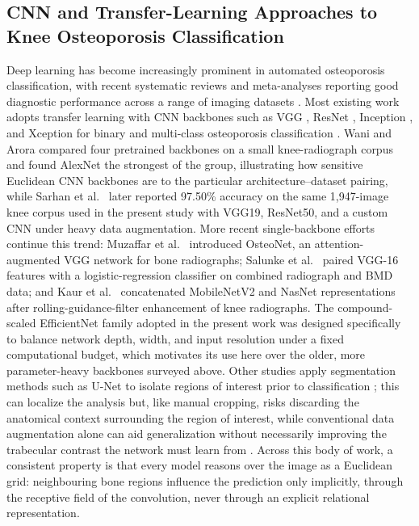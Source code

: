 \documentclass[journal]{IEEEtran}
\begin{document}
\subsection{CNN and Transfer-Learning Approaches to Knee Osteoporosis Classification}
Deep learning has become increasingly prominent in automated osteoporosis
classification, with recent systematic reviews and meta-analyses reporting good
diagnostic performance across a range of imaging datasets
\cite{Amani2024, yen2024diagnostic, wasti2025deep}. Most existing work adopts
transfer learning with CNN backbones such as VGG \cite{simonyan2015very},
ResNet \cite{he2016deep}, Inception \cite{szegedy2015going}, and Xception
\cite{chollet2017xception} for binary and multi-class osteoporosis
classification \cite{Chen2024, Feng2024, wani2023osteoporosis, Sarhan2024}.
Wani and Arora \cite{wani2023osteoporosis} compared four pretrained backbones on
a small knee-radiograph corpus and found AlexNet the strongest of the group,
illustrating how sensitive Euclidean CNN backbones are to the particular
architecture--dataset pairing, while Sarhan et al.\ \cite{Sarhan2024} later
reported 97.50\% accuracy on the same 1,947-image knee corpus used in the
present study with VGG19, ResNet50, and a custom CNN under heavy data
augmentation. More recent single-backbone efforts continue this trend: Muzaffar
et al.\ \cite{muzaffar2025osteonet} introduced OsteoNet, an attention-augmented
VGG network for bone radiographs; Salunke et al.\ \cite{salunke2025osteoporosis}
paired VGG-16 features with a logistic-regression classifier on combined
radiograph and BMD data; and Kaur et al.\ \cite{kaur2026interpretable}
concatenated MobileNetV2 and NasNet representations after rolling-guidance-filter
enhancement of knee radiographs. The compound-scaled EfficientNet family
\cite{tan2019efficientnet} adopted in the present work was designed specifically
to balance network depth, width, and input resolution under a fixed
computational budget, which motivates its use here over the older, more
parameter-heavy backbones surveyed above. Other studies apply segmentation
methods such as U-Net \cite{ronneberger2015unet} to isolate regions of interest
prior to classification \cite{Feng2024, Chen2024}; this can localize the
analysis but, like manual cropping, risks discarding the anatomical context
surrounding the region of interest, while conventional data augmentation alone
can aid generalization without necessarily improving the trabecular contrast the
network must learn from \cite{Naguib2024, Sarhan2024}. Across this body of work,
a consistent property is that every model reasons over the image as a Euclidean
grid: neighbouring bone regions influence the prediction only implicitly,
through the receptive field of the convolution, never through an explicit
relational representation.
\end{document}
